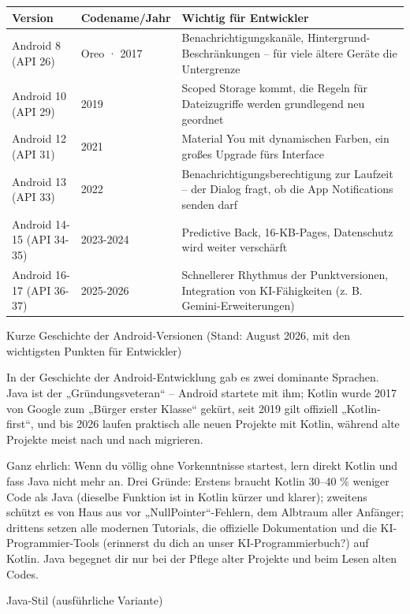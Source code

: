 \begin{center}
\begin{tabularx}{\linewidth}{|X|X|X|}
\hline
\textbf{Version} & \textbf{Codename/Jahr} & \textbf{Wichtig für Entwickler} \tabularnewline
\hline
Android 8 (API 26) & Oreo · 2017 & Benachrichtigungskanäle, Hintergrund-Beschränkungen – für viele ältere Geräte die Untergrenze \tabularnewline
Android 10 (API 29) & 2019 & Scoped Storage kommt, die Regeln für Dateizugriffe werden grundlegend neu geordnet \tabularnewline
Android 12 (API 31) & 2021 & Material You mit dynamischen Farben, ein großes Upgrade fürs Interface \tabularnewline
Android 13 (API 33) & 2022 & Benachrichtigungsberechtigung zur Laufzeit – der Dialog fragt, ob die App Notifications senden darf \tabularnewline
Android 14-15 (API 34-35) & 2023-2024 & Predictive Back, 16-KB-Pages, Datenschutz wird weiter verschärft \tabularnewline
Android 16-17 (API 36-37) & 2025-2026 & Schnellerer Rhythmus der Punktversionen, Integration von KI-Fähigkeiten (z. B. Gemini-Erweiterungen) \tabularnewline
\hline
\end{tabularx}
\end{center}

\begin{center}\small\color{gray}Kurze Geschichte der Android-Versionen (Stand: August 2026, mit den wichtigsten Punkten für Entwickler)\end{center}


In der Geschichte der Android-Entwicklung gab es zwei dominante Sprachen. Java ist der „Gründungsveteran“ – Android startete mit ihm; Kotlin wurde 2017 von Google zum „Bürger erster Klasse“ gekürt, seit 2019 gilt offiziell „Kotlin-first“, und bis 2026 laufen praktisch alle neuen Projekte mit Kotlin, während alte Projekte meist nach und nach migrieren.

Ganz ehrlich: Wenn du völlig ohne Vorkenntnisse startest, lern direkt Kotlin und fass Java nicht mehr an. Drei Gründe: Erstens braucht Kotlin 30–40 \% weniger Code als Java (dieselbe Funktion ist in Kotlin kürzer und klarer); zweitens schützt es von Haus aus vor „NullPointer“-Fehlern, dem Albtraum aller Anfänger; drittens setzen alle modernen Tutorials, die offizielle Dokumentation und die KI-Programmier-Tools (erinnerst du dich an unser KI-Programmierbuch?) auf Kotlin. Java begegnet dir nur bei der Pflege alter Projekte und beim Lesen alten Codes.

Java-Stil (ausführliche Variante)

